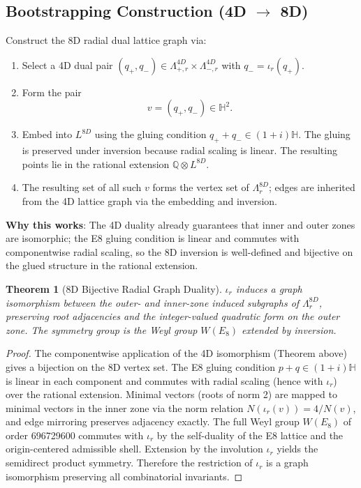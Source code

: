 \documentclass{article}
\newtheorem{theorem}{Theorem}
\begin{document}
\subsection{Bootstrapping Construction (4D \(\to\) 8D)}
Construct the 8D radial dual lattice graph via:
\begin{enumerate}
  \item Select a 4D dual pair \((q_+, q_-) \in \Lambda_{+,r}^{4D} \times \Lambda_{-,r}^{4D}\) with \(q_- = \iota_r(q_+)\).
  \item Form the pair
        \[
        v = (q_+, q_-) \in \mathbb{H}^2.
        \]
  \item Embed into \(L^{8D}\) using the gluing condition \(q_+ + q_- \in (1+i)\mathbb{H}\). The gluing is preserved under inversion because radial scaling is linear. The resulting points lie in the rational extension \(\mathbb{Q} \otimes L^{8D}\).
  \item The resulting set of all such \(v\) forms the vertex set of \(\Lambda_r^{8D}\); edges are inherited from the 4D lattice graph via the embedding and inversion.
\end{enumerate}
\textbf{Why this works}: The 4D duality already guarantees that inner and outer zones are isomorphic; the E8 gluing condition is linear and commutes with componentwise radial scaling, so the 8D inversion is well-defined and bijective on the glued structure in the rational extension.
\begin{theorem}[8D Bijective Radial Graph Duality]
\label{thm:8d-duality}
\(\iota_r\) induces a graph isomorphism between the outer- and inner-zone induced subgraphs of \(\Lambda_r^{8D}\), preserving root adjacencies and the integer-valued quadratic form on the outer zone. The symmetry group is the Weyl group \(W(E_8)\) extended by inversion.
\end{theorem}
\begin{proof}
The componentwise application of the 4D isomorphism (Theorem above) gives a bijection on the 8D vertex set. The E8 gluing condition \(p + q \in (1+i)\mathbb{H}\) is linear in each component and commutes with radial scaling (hence with \(\iota_r\)) over the rational extension. Minimal vectors (roots of norm 2) are mapped to minimal vectors in the inner zone via the norm relation \(N(\iota_r(v)) = 4/N(v)\), and edge mirroring preserves adjacency exactly. The full Weyl group \(W(E_8)\) of order 696729600 commutes with \(\iota_r\) by the self-duality of the E8 lattice and the origin-centered admissible shell. Extension by the involution \(\iota_r\) yields the semidirect product symmetry. Therefore the restriction of \(\iota_r\) is a graph isomorphism preserving all combinatorial invariants.
\end{proof}
\end{document}
